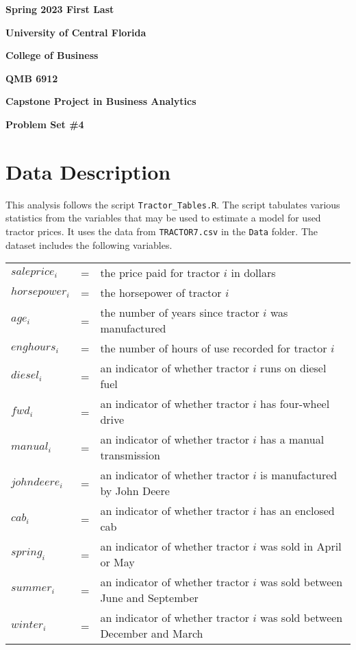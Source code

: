 \documentclass[11pt]{article}
\begin{document}

{\noindent\bf Spring 2023 \hfill First Last}
\vskip 16pt
\centerline{\bf University of Central Florida}
\centerline{\bf College of Business }
\vskip 16pt
\centerline{\bf QMB 6912}
\centerline{\bf Capstone Project in Business Analytics}
\vskip 10pt
\centerline{\bf Problem Set \#4}
\vskip 32pt
\noindent
% 
\section{Data Description}

This analysis follows the script \texttt{Tractor\_Tables.R}. 
The script tabulates various statistics from the variables that may be used to estimate a model for used tractor prices.  
It uses the data from \texttt{TRACTOR7.csv} in the \texttt{Data} folder. 
The dataset includes the following variables.
\begin{table}[h!]
\begin{tabular}{l l l}

$saleprice_i$ & = & the price paid for tractor $i$ in dollars \\
% 
$horsepower_i$ & = & the horsepower of tractor $i$ \\
$age_i$ & = & the number of years since tractor $i$ was manufactured  \\
$enghours_i$ & = & the number of hours of use recorded for tractor $i$  \\
$diesel_i$ & = & an indicator of whether tractor $i$ runs on diesel fuel \\ %
$fwd_i$ & = & an indicator of whether tractor $i$ has four-wheel drive \\ %
$manual_i$ & = & an indicator of whether tractor $i$ has a manual transmission \\ %
$johndeere_i$ & = & an indicator of whether tractor $i$ is manufactured by John Deere \\ %
$cab_i$ & = & an indicator of whether tractor $i$ has an enclosed cab \\ %
% 
$spring_i$ & = & an indicator of whether tractor $i$ was sold in April or May \\ %
$summer_i$ & = & an indicator of whether tractor $i$ was sold between June and September \\ %
$winter_i$ & = & an indicator of whether tractor $i$ was sold between December and March \\ %

\end{tabular}
\end{table}
%
\end{document}

